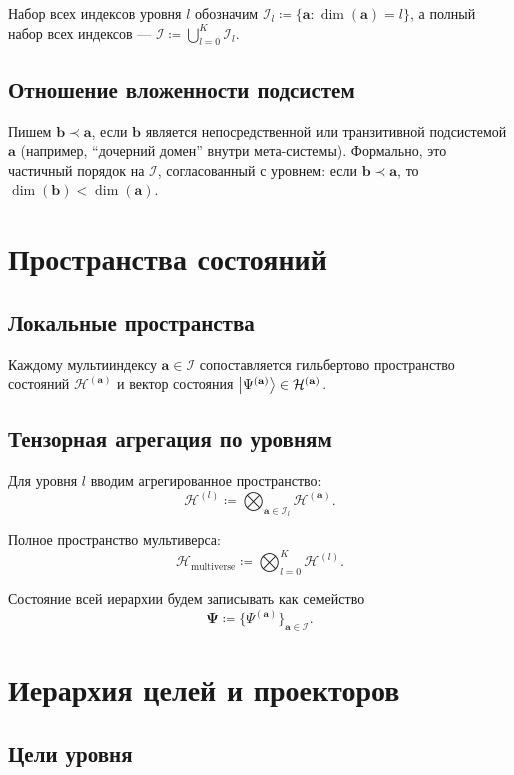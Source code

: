 \documentclass[11pt]{article}
\begin{document}
Набор всех индексов уровня $l$ обозначим $\mathcal{I}_l\coloneqq\{\mathbf{a}:\dim(\mathbf{a})=l\}$, а полный набор всех индексов --- $\mathcal{I}\coloneqq\bigcup_{l=0}^K\mathcal{I}_l$.

\subsection{Отношение вложенности подсистем}

Пишем $\mathbf{b}\prec\mathbf{a}$, если $\mathbf{b}$ является непосредственной или транзитивной подсистемой $\mathbf{a}$ (например, ``дочерний домен'' внутри мета-системы). Формально, это частичный порядок на $\mathcal{I}$, согласованный с уровнем: если $\mathbf{b}\prec\mathbf{a}$, то $\dim(\mathbf{b})<\dim(\mathbf{a})$.

\section{Пространства состояний}

\subsection{Локальные пространства}

Каждому мультииндексу $\mathbf{a}\in\mathcal{I}$ сопоставляется гильбертово пространство состояний $\mathcal{H}^{(\mathbf{a})}$ и вектор состояния $\ket{\Psi^{(\mathbf{a})}}\in\mathcal{H}^{(\mathbf{a})}$.

\subsection{Тензорная агрегация по уровням}

Для уровня $l$ вводим агрегированное пространство:
\[
\mathcal{H}^{(l)} \coloneqq \bigotimes_{\mathbf{a}\in\mathcal{I}_l} \mathcal{H}^{(\mathbf{a})}.
\]

Полное пространство мультиверса:
\[
\mathcal{H}_{\text{multiverse}} \coloneqq \bigotimes_{l=0}^{K} \mathcal{H}^{(l)}.
\]

Состояние всей иерархии будем записывать как семейство
\[
\mathbf{\Psi} \coloneqq \{\Psi^{(\mathbf{a})}\}_{\mathbf{a}\in\mathcal{I}}.
\]

\section{Иерархия целей и проекторов}

\subsection{Цели уровня}
\end{document}
